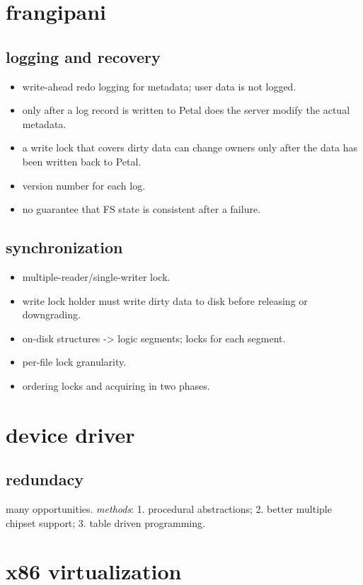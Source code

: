 \documentclass[9pt,conference]{IEEEtran}
\begin{document}
\section{frangipani}
\label{sec-7}
\subsection{logging and recovery}
\label{sec-7-1}
\begin{itemize}
\item write-ahead redo logging for metadata; user data is not logged.
\item only after a log record is written to Petal does the server modify the actual metadata.
\item a write lock that covers dirty data can change owners only after the data has been written back to Petal.
\item version number for each log.
\item no guarantee that FS state is consistent after a failure.
\end{itemize}

\subsection{synchronization}
\label{sec-7-2}
\begin{itemize}
\item multiple-reader/single-writer lock.
\item write lock holder must write dirty data to disk before releasing or downgrading.
\item on-disk structures -> logic segments; locks for each segment.
\item per-file lock granularity.
\item ordering locks and acquiring in two phases.
\end{itemize}

\section{device driver}
\label{sec-8}
\subsection{redundacy}
\label{sec-8-1}
many opportunities. \emph{methods}: 1. procedural abstractions; 2. better multiple chipset support; 3. table driven programming.

\section{x86 virtualization}
\label{sec-9}
\end{document}

